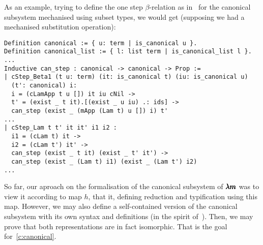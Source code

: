 As an example, trying to define the one step $\beta$-relation as in~\cite[Chapter~3.1]{JCES2002} for the canonical subsystem mechanised using subset types, we would get (supposing we had a mechanised substitution operation):
\begin{lstlisting}[language=Coq]
Definition canonical := { u: term | is_canonical u }. 
Definition canonical_list := { l: list term | is_canonical_list l }.
...
Inductive can_step : canonical -> canonical -> Prop :=
| cStep_Beta1 (t u: term) (it: is_canonical t) (iu: is_canonical u)
  (t': canonical) i:
  i = (cLamApp t u []) it iu cNil ->
  t' = (exist _ t it).[(exist _ u iu) .: ids] ->
  can_step (exist _ (mApp (Lam t) u []) i) t'
...
| cStep_Lam t t' it it' i1 i2 :
  i1 = (cLam t) it ->
  i2 = (cLam t') it' ->
  can_step (exist _ t it) (exist _ t' it') ->
  can_step (exist _ (Lam t) i1) (exist _ (Lam t') i2)
...
\end{lstlisting}

So far, our aproach on the formalisation of the canonical subsystem of $\pmb{\lambda m}$ was to view it according to map $h$, that it, defining reduction and typification using this map.
However, we may also define a self-contained version of the canonical subsystem with its own syntax and definitions (in the spirit of~\cite[Chapter~3.1]{JCES2002}). %
Then, we may prove that both representations are in fact isomorphic.
That is the goal for~\cref{c:canonical}.

